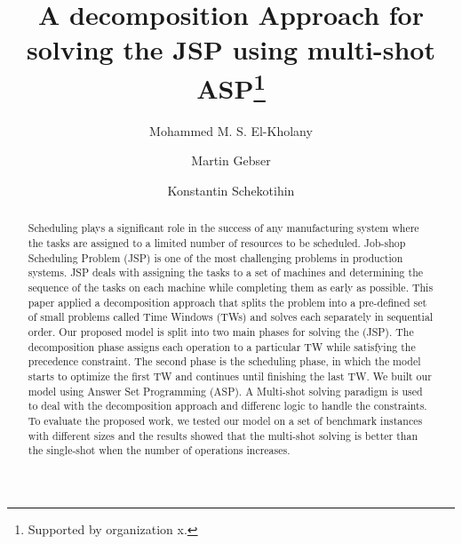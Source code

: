 \documentclass[runningheads]{llncs}
\begin{document}
%
\title{A decomposition Approach for solving the JSP using multi-shot ASP\thanks{Supported by organization x.}}
%
%
\author{Mohammed M. S. El-Kholany \and
Martin Gebser \and
Konstantin Schekotihin}
%
%
%
\maketitle              %
%
\begin{abstract}
    Scheduling plays a significant role in the success of any manufacturing system where the tasks are assigned to a limited number of resources to be scheduled. Job-shop Scheduling Problem (JSP) is one of the most challenging problems in production systems. JSP deals with assigning the tasks to a set of machines and determining the sequence of the tasks on each machine while completing them as early as possible. This paper applied a decomposition approach that splits the problem into a pre-defined set of small problems called Time Windows (TWs) and solves each separately in sequential order. Our proposed model is split into two main phases for solving the (JSP). The decomposition phase assigns each operation to a particular TW while satisfying the precedence constraint. The second phase is the scheduling phase, in which the model starts to optimize the first TW and continues until finishing the last TW. We built our model using Answer Set Programming (ASP). A Multi-shot solving paradigm is used to deal with the decomposition approach and differenc logic to handle the constraints. To evaluate the proposed work, we tested our model on a set of benchmark instances with different sizes and the results showed that the multi-shot solving is better than the single-shot when the number of operations increases. 
\end{abstract}
%
%
%
\end{document}
